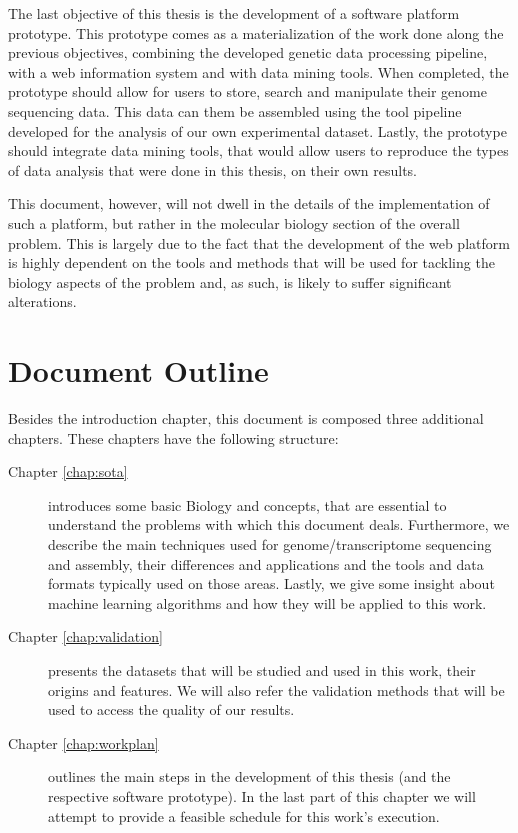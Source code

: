 The last objective of this thesis is the development of a software platform
prototype. This prototype comes as a materialization of the work done along the
previous objectives, combining the developed genetic data processing pipeline,
with a web information system and with data mining tools. When completed, the
prototype should allow for users to store, search and manipulate their genome
sequencing data. This data can them be assembled using the tool pipeline
developed for the analysis of our own experimental dataset. Lastly, the
prototype should integrate data mining tools, that would allow users to
reproduce the types of data analysis that were done in this thesis, on their own
results.

This document, however, will not dwell in the details of the implementation of
such a platform, but rather in the molecular biology section of the overall
problem. This is largely due to the fact that the development of the web
platform is highly dependent on the tools and methods that will be used for
tackling the biology aspects of the problem and, as such, is likely to suffer
significant alterations.

\section{Document Outline} \label{sec:outline}

Besides the introduction chapter, this document is composed three additional
chapters. These chapters have the following structure:

\begin{description}

  \item[Chapter \ref{chap:sota}]
  introduces some basic Biology and \rnaseq{} concepts, that are essential to
  understand the problems with which this document deals. Furthermore, we
  describe the main techniques used for genome/transcriptome sequencing and
  assembly, their differences and applications and the tools and data formats
  typically used on those areas. Lastly, we give some insight about machine
  learning algorithms and how they will be applied to this work.

  \item[Chapter \ref{chap:validation}]
  presents the datasets that will be studied and used in this work, their
  origins and features. We will also refer the validation methods that will
  be used to access the quality of our results.

  \item[Chapter \ref{chap:workplan}]
  outlines the main steps in the development of this thesis (and the respective
  software prototype). In the last part of this chapter we will attempt to
  provide a feasible schedule for this work's execution.

\end{description}
